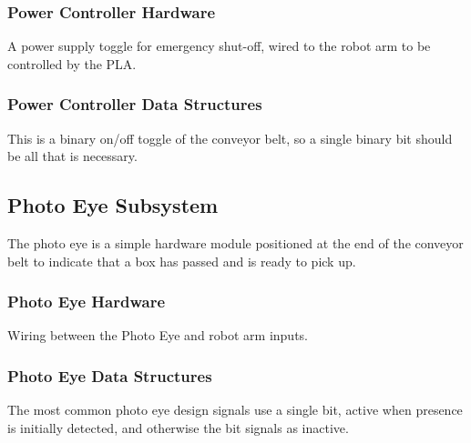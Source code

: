 \subsubsection{Power Controller Hardware}
A power supply toggle for emergency shut-off, wired to the robot arm to be controlled by the PLA.

\subsubsection{Power Controller Data Structures}
This is a binary on/off toggle of the conveyor belt, so a single binary bit should be all that is necessary.

\subsection{Photo Eye Subsystem}
The photo eye is a simple hardware module positioned at the end of the conveyor belt to indicate that a box has passed and is ready to pick up. 

\subsubsection{Photo Eye Hardware}
Wiring between the Photo Eye and robot arm inputs.

\subsubsection{Photo Eye Data Structures}
The most common photo eye design signals use a single bit, active when presence is initially detected, and otherwise the bit signals as inactive.
